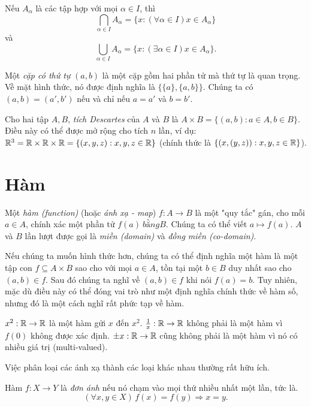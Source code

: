 \begin{notation}
  Nếu $A_\alpha$ là các tập hợp với mọi $\alpha \in I$, thì
  \[
    \bigcap_{\alpha\in I}A_\alpha = \{x: (\forall\alpha\in I) x\in A_\alpha\}
  \]
  và
  \[
    \bigcup_{\alpha\in I}A_\alpha = \{x: (\exists\alpha\in I) x\in A_\alpha\}.
  \]
\end{notation}

\begin{defi}
  Một \emph{cặp có thứ tự} $(a, b)$ là một cặp gồm hai phần tử mà thứ tự là quan trọng. Về mặt hình thức, nó được định nghĩa là $\{\{a\}, \{a, b\}\}$. Chúng ta có $(a, b) = (a', b')$ nếu và chỉ nếu $a = a'$ và $b = b'$.
\end{defi}

\begin{defi}
  Cho hai tập $A, B$, \emph{tích Descartes} của $A$ và $B$ là $A\times B = \{(a, b):a\in A, b\in B\} $. Điều này có thể được mở rộng cho tích $n$ lần, ví dụ:\ $\mathbb{R}^3 = \mathbb{R}\times\mathbb{R}\times\mathbb{R} = \{(x,y,z): x, y, z\in \mathbb{R}\} $ (chính thức là $\{(x, (y, z)): x, y, z\in \mathbb{R}\}$).
\end{defi}

\section{Hàm}

\begin{defi}
  Một \emph{hàm (function)} (hoặc \emph{ánh xạ - map}) $f: A\to B$ là một "quy tắc" gán, cho mỗi $a\in A$, chính xác một phần tử $f(a)\ bằng B$. Chúng ta có thể viết $a\mapsto f(a)$. $A$ và $B$ lần lượt được gọi là \emph{miền (domain)} và \emph{đồng miền (co-domain)}.
\end{defi}
Nếu chúng ta muốn hình thức hơn, chúng ta có thể định nghĩa một hàm là một tập con $f \subseteq A \times B$ sao cho với mọi $a \in A$, tồn tại một $b\in B$ duy nhất sao cho $ (a, b)\in f$. Sau đó chúng ta nghĩ về $(a, b) \in f$ khi nói $f(a) = b$. Tuy nhiên, mặc dù điều này có thể đóng vai trò như một định nghĩa chính thức về hàm số, nhưng đó là một cách nghĩ rất phức tạp về hàm.

\begin{eg}
  $x^2: \mathbb{R} \to \mathbb{R}$ là một hàm gửi $x$ đến $x^2$. $\frac{1}{x}:\mathbb{R}\to\mathbb{R}$ không phải là một hàm vì $f(0)$ không được xác định. $\pm x: \mathbb{R}\to\mathbb{R}$ cũng không phải là một hàm vì nó có nhiều giá trị (multi-valued).
\end{eg}

Việc phân loại các ánh xạ thành các loại khác nhau thường rất hữu ích.
\begin{defi}
  Hàm $f: X \to Y$ là \emph{đơn ánh} nếu nó chạm vào mọi thứ nhiều nhất một lần, tức là.
  \[
    (\forall x, y\in X)\,f(x) = f(y)\Rightarrow x = y.
  \]
\end{defi}

